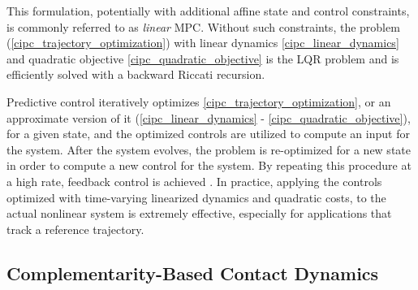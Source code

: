 This formulation, potentially with additional affine state and control constraints, is commonly referred to as \textit{linear} MPC. Without such constraints, the problem 
(\ref{cipc_trajectory_optimization}) with linear dynamics \eqref{cipc_linear_dynamics} and quadratic objective \eqref{cipc_quadratic_objective} is the LQR problem \cite{kalman1964lqr} and is efficiently solved with a backward Riccati recursion. 

Predictive control iteratively optimizes \eqref{cipc_trajectory_optimization}, or an approximate version of it (\ref{cipc_linear_dynamics} - \ref{cipc_quadratic_objective}), for a given state, and the optimized controls are utilized to compute an input for the system. After the system evolves, the problem is re-optimized for a new state in order to compute a new control for the system. By repeating this procedure at a high rate, feedback control is achieved \cite{wang2009fast}. In practice, applying the controls optimized with time-varying linearized dynamics and quadratic costs, to the actual nonlinear system is extremely effective, especially for applications that track a reference trajectory.
{\small }
\subsection{Complementarity-Based Contact Dynamics}

